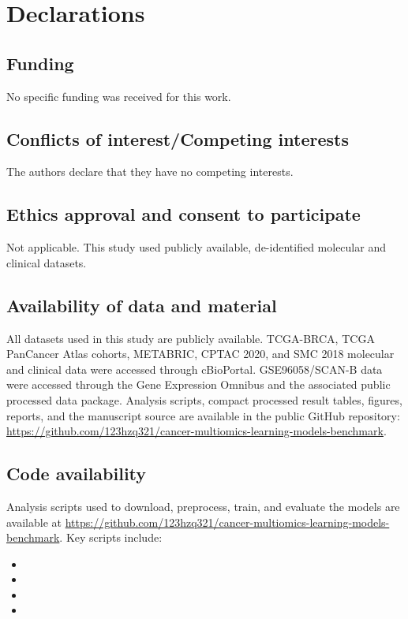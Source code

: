 \section*{Declarations}

\subsection*{Funding}

No specific funding was received for this work.

\subsection*{Conflicts of interest/Competing interests}

The authors declare that they have no competing interests.

\subsection*{Ethics approval and consent to participate}

Not applicable. This study used publicly available, de-identified molecular and clinical datasets.

\subsection*{Availability of data and material}

All datasets used in this study are publicly available. TCGA-BRCA, TCGA PanCancer Atlas cohorts, METABRIC, CPTAC 2020, and SMC 2018 molecular and clinical data were accessed through cBioPortal. GSE96058/SCAN-B data were accessed through the Gene Expression Omnibus and the associated public processed data package. Analysis scripts, compact processed result tables, figures, reports, and the manuscript source are available in the public GitHub repository: \url{https://github.com/123hzq321/cancer-multiomics-learning-models-benchmark}.

\subsection*{Code availability}

Analysis scripts used to download, preprocess, train, and evaluate the models are available at \url{https://github.com/123hzq321/cancer-multiomics-learning-models-benchmark}. Key scripts include:
\begingroup
\footnotesize
\begin{itemize}
\item {}
\item {}
\item {}
\item {}
\end{itemize}
\endgroup

